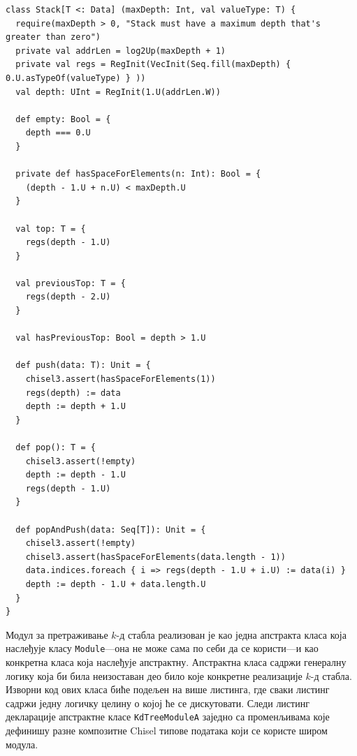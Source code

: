 \documentclass[master]{finthesis}
\newcommand*{\kd}{\texorpdfstring{$k$}{k}-д }
\newcommand*{\prog}[1]{\texttt{#1}}
\begin{document}
\begin{lstlisting}[style=Chisel, caption={Реализација класе \prog{Stack}.}, label={lst:stack}]
class Stack[T <: Data] (maxDepth: Int, val valueType: T) {
  require(maxDepth > 0, "Stack must have a maximum depth that's greater than zero")
  private val addrLen = log2Up(maxDepth + 1)
  private val regs = RegInit(VecInit(Seq.fill(maxDepth) { 0.U.asTypeOf(valueType) } ))
  val depth: UInt = RegInit(1.U(addrLen.W))

  def empty: Bool = {
    depth === 0.U
  }

  private def hasSpaceForElements(n: Int): Bool = {
    (depth - 1.U + n.U) < maxDepth.U
  }

  val top: T = {
    regs(depth - 1.U)
  }

  val previousTop: T = {
    regs(depth - 2.U)
  }

  val hasPreviousTop: Bool = depth > 1.U

  def push(data: T): Unit = {
    chisel3.assert(hasSpaceForElements(1))
    regs(depth) := data
    depth := depth + 1.U
  }

  def pop(): T = {
    chisel3.assert(!empty)
    depth := depth - 1.U
    regs(depth - 1.U)
  }

  def popAndPush(data: Seq[T]): Unit = {
    chisel3.assert(!empty)
    chisel3.assert(hasSpaceForElements(data.length - 1))
    data.indices.foreach { i => regs(depth - 1.U + i.U) := data(i) }
    depth := depth - 1.U + data.length.U
  }
}
\end{lstlisting}

Модул за претраживање \kd стабла реализован је као једна апстракта класа која наслеђује класу \prog{Module}---она не може сама по себи да се користи---и као конкретна класа која наслеђује апстрактну. Апстрактна класа садржи генералну логику која би била неизоставан део било које конкретне реализације \kd стабла. Изворни код ових класа биће подељен на више листинга, где сваки листинг садржи једну логичку целину о којој ће се дискутовати. Следи листинг декларације апстрактне класе \prog{KdTreeModuleA} заједно са променљивама које дефинишу разне композитне Chisel типове података који се користе широм модула.
\end{document}
